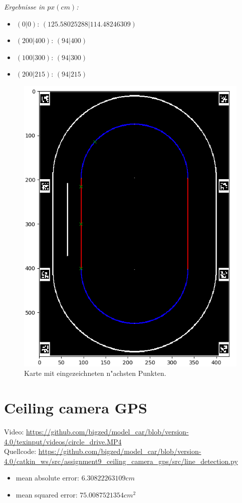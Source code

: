 \documentclass[10pt,oneside,a4paper]{article}
\begin{document}
    \emph{Ergebnisse in \( px(cm) \):}
    \begin{itemize}
      \item{\((0 | 0)\)}: \( (125.58025288 | 114.48246309) \)
      \item{\((200 | 400)\)}: \( (94 | 400) \)
      \item{\((100 | 300)\)}: \( (94 | 300) \)
      \item{\((200 | 215)\)}: \( (94 | 215) \)
    \end{itemize}
    \begin{figure}[h]
      \centering
      \includegraphics[scale=0.5]{pictures/closest_point_graph.png}
      \caption{Karte mit eingezeichneten n"achsten Punkten.}
    \end{figure}
    \newpage

  \section{Ceiling camera GPS}
	Video: \url{https://github.com/bigzed/model_car/blob/version-4.0/texinput/videos/circle_drive.MP4} \\
    Quellcode: \url{https://github.com/bigzed/model_car/blob/version-4.0/catkin_ws/src/assignment9_ceiling_camera_gps/src/line_detection.py}
    \begin{itemize}
      \item mean absolute error: \( 6.30822263109cm \)
      \item mean squared error: \( 75.0087521354cm^{2} \)
    \end{itemize}
\end{document}
